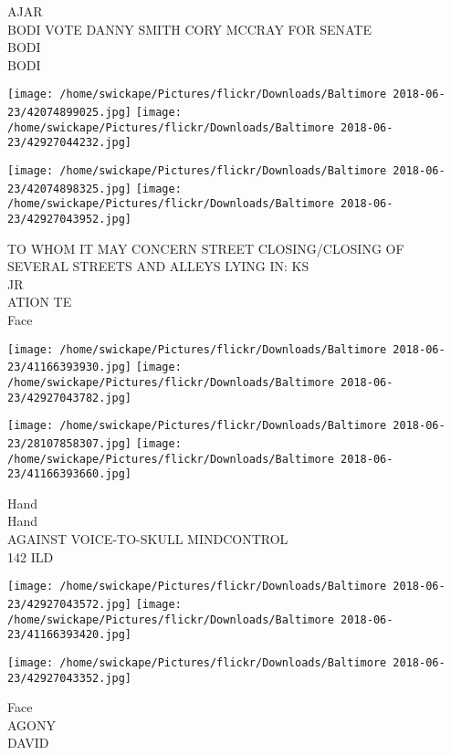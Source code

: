 \documentclass[10pt,letterpaper]{article}
\begin{document}
AJAR\\
BODI VOTE DANNY SMITH CORY MCCRAY FOR SENATE\\
BODI\\
BODI\\
\pagebreak

\texttt{[image: /home/swickape/Pictures/flickr/Downloads/Baltimore 2018-06-23/42074899025.jpg]}
\texttt{[image: /home/swickape/Pictures/flickr/Downloads/Baltimore 2018-06-23/42927044232.jpg]}

\texttt{[image: /home/swickape/Pictures/flickr/Downloads/Baltimore 2018-06-23/42074898325.jpg]}
\texttt{[image: /home/swickape/Pictures/flickr/Downloads/Baltimore 2018-06-23/42927043952.jpg]}

TO WHOM IT MAY CONCERN STREET CLOSING/CLOSING OF SEVERAL STREETS AND ALLEYS LYING IN: KS\\
JR\\
ATION TE\\
Face\\
\pagebreak

\texttt{[image: /home/swickape/Pictures/flickr/Downloads/Baltimore 2018-06-23/41166393930.jpg]}
\texttt{[image: /home/swickape/Pictures/flickr/Downloads/Baltimore 2018-06-23/42927043782.jpg]}

\texttt{[image: /home/swickape/Pictures/flickr/Downloads/Baltimore 2018-06-23/28107858307.jpg]}
\texttt{[image: /home/swickape/Pictures/flickr/Downloads/Baltimore 2018-06-23/41166393660.jpg]}

Hand\\
Hand\\
AGAINST VOICE{-}TO{-}SKULL MINDCONTROL\\
142 ILD\\
\pagebreak

\texttt{[image: /home/swickape/Pictures/flickr/Downloads/Baltimore 2018-06-23/42927043572.jpg]}
\texttt{[image: /home/swickape/Pictures/flickr/Downloads/Baltimore 2018-06-23/41166393420.jpg]}

\vspace{0.25in}
\texttt{[image: /home/swickape/Pictures/flickr/Downloads/Baltimore 2018-06-23/42927043352.jpg]}

Face\\
AGONY\\
DAVID\\
\pagebreak
\end{document}
